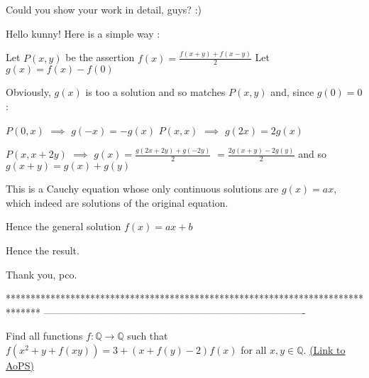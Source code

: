 \begin{solution}
	\begin{tcolorbox}Could you show your work in detail, guys? :)\end{tcolorbox}

Hello kunny! Here is a simple way :

Let $ P(x,y)$ be the assertion $ f(x)=\frac{f(x+y)+f(x-y)}2$
Let $ g(x)=f(x)-f(0)$

Obviously, $ g(x)$ is too a solution and so matches $ P(x,y)$ and, since $ g(0)=0$ :

$ P(0,x)$ $ \implies$ $ g(-x)=-g(x)$
$ P(x,x)$ $ \implies$ $ g(2x)=2g(x)$

$ P(x,x+2y)$ $ \implies$ $ g(x)=\frac{g(2x+2y)+g(-2y)}2$ $ =\frac{2g(x+y)-2g(y)}2$ and so $ g(x+y)=g(x)+g(y)$

This is a Cauchy equation whose only continuous solutions are $ g(x)=ax$, which indeed are solutions of the original equation.

Hence the general solution $ f(x)=ax+b$

Hence the result.
\end{solution}



\begin{solution}
	Thank you, pco.
\end{solution}
*******************************************************************************
-------------------------------------------------------------------------------

\begin{problem}
	Find all functions $f: \mathbb Q \to \mathbb Q$  such that $ f(x^{2}+y+f(xy)) = 3+(x+f(y)-2)f(x)$ for all $x,y \in \mathbb Q$.
	\flushright \href{https://artofproblemsolving.com/community/q2h167309}{(Link to AoPS)}
\end{problem}



